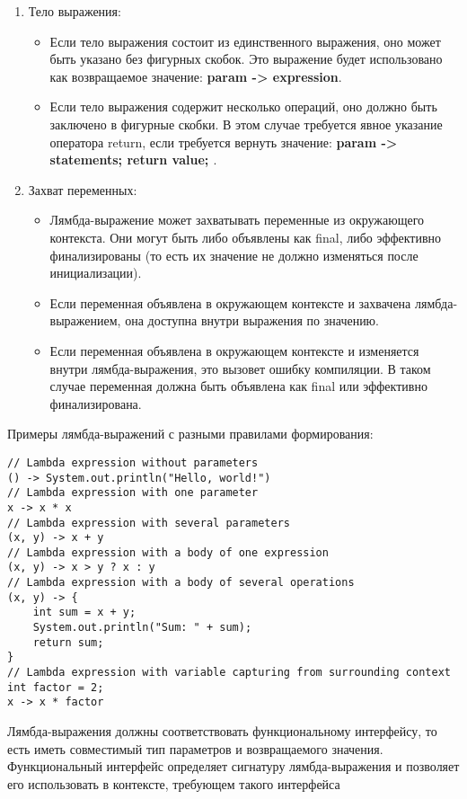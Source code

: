 \documentclass[12pt, a4paper]{book}%
\begin{document}
{\begin{enumerate}
\item Тело выражения:
    \begin{itemize} 
    \item Если тело выражения состоит из единственного выражения, оно может быть указано без фигурных скобок. Это выражение будет использовано как возвращаемое значение: {\bf param -> expression}.
    \item Если тело выражения содержит несколько операций, оно должно быть заключено в фигурные скобки. В этом случае требуется явное указание оператора return, если требуется вернуть значение: {\bf param -> { statements; return value; }}.
    \end{itemize}
\item Захват переменных:
\begin{itemize} 
    \item Лямбда-выражение может захватывать переменные из окружающего контекста. Они могут быть либо объявлены как final, либо эффективно финализированы (то есть их значение не должно изменяться после инициализации).
    \item Если переменная объявлена в окружающем контексте и захвачена лямбда-выражением, она доступна внутри выражения по значению.
    \item Если переменная объявлена в окружающем контексте и изменяется внутри лямбда-выражения, это вызовет ошибку компиляции. В таком случае переменная должна быть объявлена как final или эффективно финализирована.
\end{itemize}
\end{enumerate}

Примеры лямбда-выражений с разными правилами формирования:
\begin{lstlisting}
// Lambda expression without parameters
() -> System.out.println("Hello, world!")
// Lambda expression with one parameter
x -> x * x
// Lambda expression with several parameters
(x, y) -> x + y
// Lambda expression with a body of one expression
(x, y) -> x > y ? x : y
// Lambda expression with a body of several operations
(x, y) -> {
    int sum = x + y;
    System.out.println("Sum: " + sum);
    return sum;
}
// Lambda expression with variable capturing from surrounding context
int factor = 2;
x -> x * factor
\end{lstlisting}
Лямбда-выражения должны соответствовать функциональному интерфейсу, то есть иметь совместимый тип параметров и возвращаемого значения. Функциональный интерфейс определяет сигнатуру лямбда-выражения и позволяет его использовать в контексте, требующем такого интерфейса
}
\end{document}
